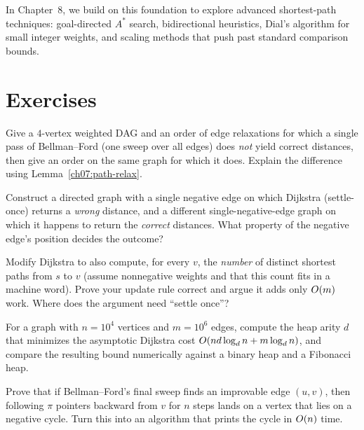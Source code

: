In Chapter~8, we build on this foundation to explore advanced shortest-path techniques:
goal-directed $A^\ast$ search, bidirectional heuristics, Dial's algorithm for small integer weights,
and scaling methods that push past standard comparison bounds.

\section{Exercises}
\label{ch07:exercises}

\begin{exercise}
Give a $4$-vertex weighted DAG and an order of edge relaxations for which a single pass of
Bellman--Ford (one sweep over all edges) does \emph{not} yield correct distances, then give
an order on the same graph for which it does. Explain the difference using
Lemma~\ref{ch07:path-relax}.
\end{exercise}

\begin{exercise}
Construct a directed graph with a single negative edge on which Dijkstra (settle-once)
returns a \emph{wrong} distance, and a different single-negative-edge graph on which it
happens to return the \emph{correct} distances. What property of the negative edge's
position decides the outcome?
\end{exercise}

\begin{exercise}
Modify Dijkstra to also compute, for every $v$, the \emph{number} of distinct shortest
paths from $s$ to $v$ (assume nonnegative weights and that this count fits in a machine
word). Prove your update rule correct and argue it adds only $O(m)$ work. Where does the
argument need ``settle once''?
\end{exercise}

\begin{exercise}
For a graph with $n=10^4$ vertices and $m=10^6$ edges, compute the heap arity $d$ that
minimizes the asymptotic Dijkstra cost $O\!\left(nd\log_d n + m\log_d n\right)$, and
compare the resulting bound numerically against a binary heap and a Fibonacci heap.
\end{exercise}

\begin{exercise}
Prove that if Bellman--Ford's final sweep finds an improvable edge $(u,v)$, then following
$\pi$ pointers backward from $v$ for $n$ steps lands on a vertex that lies on a negative
cycle. Turn this into an algorithm that prints the cycle in $O(n)$ time.
\end{exercise}


